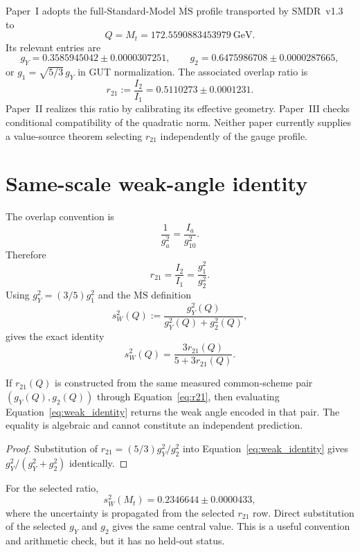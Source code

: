 \documentclass[11pt]{article}
\begin{document}
Paper~I adopts the full-Standard-Model $\overline{\mathrm{MS}}$ profile
transported by SMDR~v1.3 to
\[
Q=M_t=172.5590883453979~\mathrm{GeV}.
\]
Its relevant entries are
\[
g_Y=0.3585945042\pm0.0000307251,
\qquad
g_2=0.6475986708\pm0.0000287665,
\]
or $g_1=\sqrt{5/3}\,g_Y$ in GUT normalization. The associated overlap ratio is
\[
r_{21}:=\frac{I_2}{I_1}=0.5110273\pm0.0001231.
\]
Paper~II realizes this ratio by calibrating its effective geometry. Paper~III
checks conditional compatibility of the quadratic norm. Neither paper
currently supplies a value-source theorem selecting $r_{21}$ independently of
the gauge profile.

\section{Same-scale weak-angle identity}

The overlap convention is
\[
\frac{1}{g_a^2}=\frac{I_a}{g_{10}^2}.
\]
Therefore
\begin{equation}
r_{21}=\frac{I_2}{I_1}=\frac{g_1^2}{g_2^2}.
\label{eq:r21}
\end{equation}
Using $g_Y^2=(3/5)g_1^2$ and the $\overline{\mathrm{MS}}$ definition
\[
s_W^2(Q):=\frac{g_Y^2(Q)}{g_Y^2(Q)+g_2^2(Q)},
\]
gives the exact identity \cite{PDG2024}
\begin{equation}
\boxed{s_W^2(Q)=\frac{3r_{21}(Q)}{5+3r_{21}(Q)}.}
\label{eq:weak_identity}
\end{equation}

\begin{theorem}
If $r_{21}(Q)$ is constructed from the same measured common-scheme pair
$(g_Y(Q),g_2(Q))$ through Equation~\eqref{eq:r21}, then evaluating
Equation~\eqref{eq:weak_identity} returns the weak angle encoded in that pair.
The equality is algebraic and cannot constitute an independent prediction.
\end{theorem}

\begin{proof}
Substitution of $r_{21}=(5/3)g_Y^2/g_2^2$ into
Equation~\eqref{eq:weak_identity} gives
$g_Y^2/(g_Y^2+g_2^2)$ identically.
\end{proof}

For the selected ratio,
\begin{equation}
s_W^2(M_t)=0.2346644\pm0.0000433,
\end{equation}
where the uncertainty is propagated from the selected $r_{21}$ row. Direct
substitution of the selected $g_Y$ and $g_2$ gives the same central value. This
is a useful convention and arithmetic check, but it has no held-out status.
\end{document}
